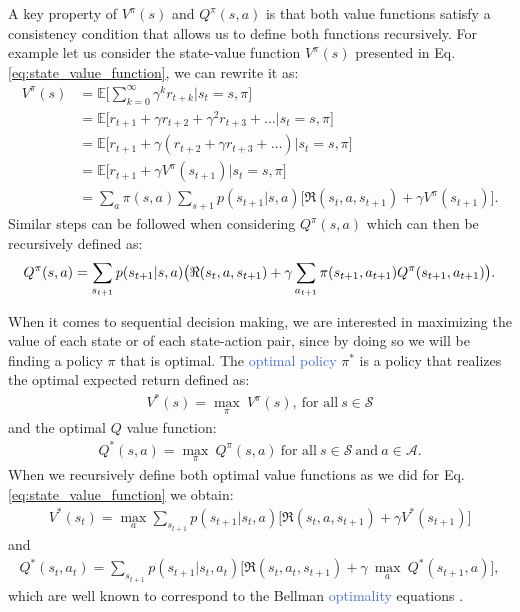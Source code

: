 A key property of $V^{\pi}(s)$ and $Q^{\pi}(s,a)$ is that both value functions satisfy a consistency condition that allows us to define both functions recursively. For example let us consider the state-value function $V^{\pi}(s)$ presented in Eq. \ref{eq:state_value_function}, we can rewrite it as:
\begin{align}
 V^{\pi}(s) & =\mathds{E}\big[\sum_{k=0}^{\infty}\gamma^{k}r_{t+k}\big| s_t = s, \pi \big] \\ 
 & =\mathds{E}\big[r_{t+1}+\gamma r_{t+2}+\gamma^{2}r_{t+3}+\ldots \big| s_t =s , \pi \big] \\ 
 & =\mathds{E}\big[r_{t+1}+\gamma(r_{t+2}+\gamma r_{t+3}+\ldots)\big| s_t =s , \pi \big] \\
 & =\mathds{E}\big[r_{t+1}+\gamma V^{\pi}(s_{t+1}) \big| s_t =s , \pi \big] \\
 & =\sum_a \pi(s,a) \sum_{s+1} p(s_{t+1}|s,a)\big[\Re(s_t, a, s_{t+1}) + \gamma V^{\pi}(s_{t+1}) \big].
\end{align}
Similar steps can be followed when considering $Q^{\pi}(s,a)$ which can then be recursively defined as:
\begin{equation}
	Q^{\pi}(s,a) = \sum_{s_{t+1}} p(s_{t+1}|s,a)\big(\Re(s_t, a, s_{t+1}) + \\ \gamma \sum_{a_{t+1}} \pi(s_{t+1},a_{t+1}) Q^{\pi}(s_{t+1}, a_{t+1}) \big).
\end{equation}

When it comes to sequential decision making, we are interested in maximizing the value of each state or of each state-action pair, since by doing so we will be finding a policy $\pi$ that is optimal. The \textcolor{RoyalBlue}{optimal policy} $\pi^{*}$ is a policy that realizes the optimal expected return defined as:
\begin{align}
 V^{*}(s)=\underset{\pi}{\max}\:V^{\pi}(s), \ \text{for all} \ s\in\mathcal{S}
\end{align}
and the optimal $Q$ value function:
\begin{align}
Q^{*}(s,a)= \underset{\pi}{\max}\:Q^{\pi}(s,a) \ \text{for all} \ s\in\mathcal{S} \ \text{and} \ a \in\mathcal{    A}.
\end{align}
When we recursively define both optimal value functions as we did for Eq. \ref{eq:state_value_function} we obtain:
\begin{align}
    V^{*}(s_t) = \underset{a}{\max}\sum_{s_{t+1}}p(s_{t+1} | s_{t}, a) \bigg[\Re (s_{t}, a, s_{t+1}) + \gamma V^{*}(s_{t+1}) \bigg]
    \label{eq:optimal_v}
\end{align}
and
\begin{multline}
    Q^{*}(s_t,a_t)=\sum_{s_{t+1}}p(s_{t+1} | s_{t}, a_{t})  \bigg[\Re (s_{t}, a_{t}, s_{t+1}) + \gamma \: \underset{a}{\max} \: Q^{*}(s_{t+1}, a) \bigg],
    \label{eq:optimal_q}
\end{multline}
which are well known to correspond to the Bellman \textcolor{RoyalBlue}{optimality} equations \cite{bellman1966dynamic}. 


